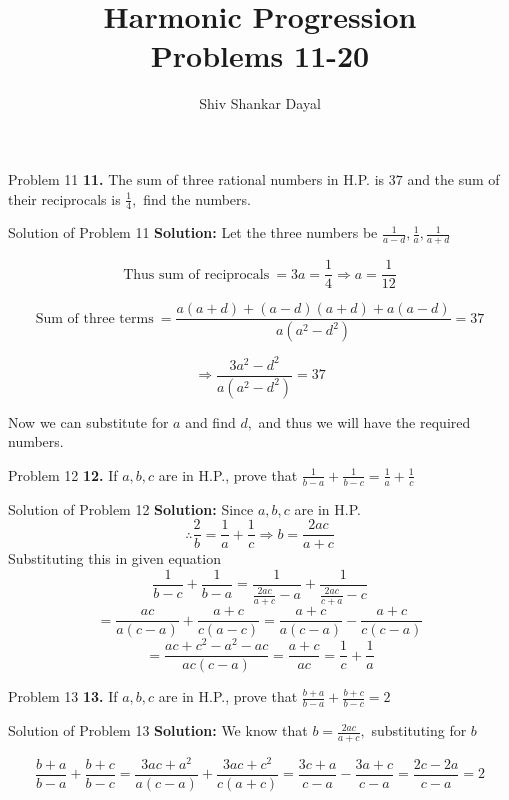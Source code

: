 \documentclass[aspectratio=1610,8pt]{beamer}
\title{Harmonic Progression\\Problems 11-20}
\author[Shiv Shankar Dayal]{Shiv Shankar Dayal}
\begin{document}
\begin{frame}
  \titlepage
\end{frame}
\begin{frame}{Problem 11}
  \textbf{11.} The sum of three rational numbers in H.P. is $37$ and the sum of
  their reciprocals is $\frac{1}{4},$ find the numbers.
\end{frame}
\begin{frame}{Solution of Problem 11}
  \textbf{Solution:} Let the three numbers be $\frac{1}{a - d}, \frac{1}{a},
  \frac{1}{a + d}$

  $$\text{Thus sum of reciprocals}~ = 3a = \frac{1}{4}\Rightarrow a =
  \frac{1}{12}$$

  $$\text{Sum of three terms}~ = \frac{a(a + d) + (a - d)(a + d) + a(a -
    d)}{a(a^2 - d^2)} = 37$$

  $$\Rightarrow \frac{3a^2 - d^2}{a(a^2 - d^2)} = 37$$

  Now we can substitute for $a$ and find $d,$ and thus we will have the
  required numbers.
\end{frame}
\begin{frame}{Problem 12}
  \textbf{12.} If $a, b, c$ are in H.P., prove that $\frac{1}{b - a} +
  \frac{1}{b - c} = \frac{1}{a} + \frac{1}{c}$
\end{frame}
\begin{frame}{Solution of Problem 12}
  \textbf{Solution:} Since $a, b, c$ are in H.P.
  $$\therefore \frac{2}{b} = \frac{1}{a} + \frac{1}{c} \Rightarrow b =
  \frac{2ac}{a + c}$$
  Substituting this in given equation
  $$\frac{1}{b - c} + \frac{1}{b - a} = \frac{1}{\frac{2ac}{a + c} - a} +
  \frac{1}{\frac{2ac}{c + a} - c}$$
  $$= \frac{ac}{a(c - a)} + \frac{a + c}{c(a - c)} = \frac{a + c}{a(c - a)} -
  \frac{a + c}{c(c - a)}$$
  $$= \frac{ac + c^2 - a^2 - ac}{ac(c - a)} = \frac{a + c}{ac} = \frac{1}{c} +
  \frac{1}{a}$$
\end{frame}
\begin{frame}{Problem 13}
  \textbf{13.} If $a, b, c$ are in H.P., prove that $\frac{b + a}{b - a} +
  \frac{b + c}{b - c} = 2$
\end{frame}
\begin{frame}{Solution of Problem 13}
  \textbf{Solution:} We know that $b = \frac{2ac}{a + c},$ substituting for $b$

  $$\frac{b + a}{b - a} + \frac{b + c}{b - c} = \frac{3ac + a^2}{a(c - a)} +
  \frac{3ac + c^2}{c(a + c)} = \frac{3c + a}{c - a} - \frac{3a + c}{c - a} =
  \frac{2c - 2a}{c - a} = 2$$
\end{frame}
\end{document}
